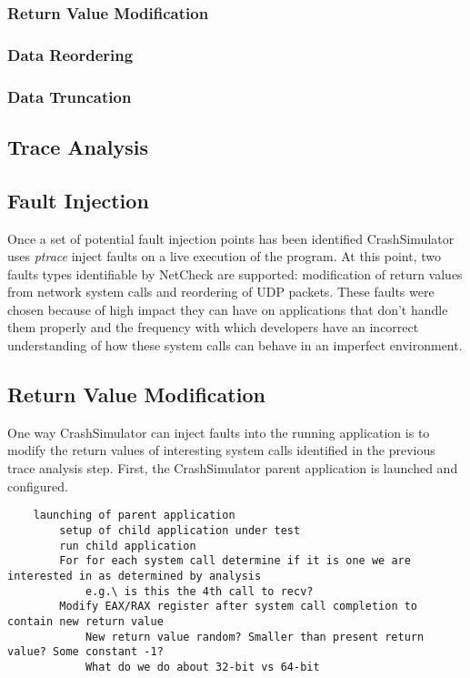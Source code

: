     \subsubsection{Return Value Modification}

    \subsubsection{Data Reordering}

    \subsubsection{Data Truncation}

    \subsection{Trace Analysis}



    \subsection{Fault Injection}

     Once a set of potential fault injection points has been identified CrashSimulator uses
    \emph{ptrace} inject faults on a live execution of the program. At this point, two faults types identifiable by
    NetCheck are supported: modification of return values from network system calls and reordering of UDP packets.
    These faults were chosen because of high impact they can have on applications that don't handle them properly and
    the frequency with which developers have an incorrect understanding of how these system calls can behave in an
    imperfect environment.

    \subsection{Return Value Modification}

    One way CrashSimulator can inject faults into the running application is to
    modify the return values of interesting system calls identified in the previous trace analysis step. First, the
    CrashSimulator parent application is launched and configured.

    \begin{verbatim}
    launching of parent application
        setup of child application under test
        run child application
        For for each system call determine if it is one we are interested in as determined by analysis
            e.g.\ is this the 4th call to recv?
        Modify EAX/RAX register after system call completion to contain new return value
            New return value random? Smaller than present return value? Some constant -1?
            What do we do about 32-bit vs 64-bit
    \end{verbatim}

